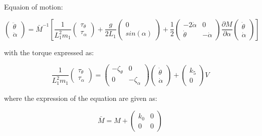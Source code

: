 
Equaion of motion:

\begin{equation}
\left( \begin{matrix}
        \ddot \theta \\
        \ddot \alpha
    \end{matrix} \right) = \bar M^{-1} \left[
\frac{1}{ L_1^2 m_1}
    \left( \begin{matrix}
        \tau_{\theta} \\
        \tau_{\alpha}
    \end{matrix} \right)
    +\frac{g}{2L_1}
    \left( \begin{matrix}
        0 \\
        sin( \alpha)
    \end{matrix} \right)
     + \frac{1}{2} \left( \begin{matrix}
    - 2 \dot \alpha & 0\\
        \dot \theta & -\dot \alpha
    \end{matrix} \right)
    \frac{\partial M}{\partial \alpha}
     \left( \begin{matrix}
        \dot \theta \\
        \dot \alpha
    \end{matrix} \right) \right]
\end{equation}

with the torque expressed as:

\begin{equation}
\frac{1}{ L_1^2 m_1}
    \left( \begin{matrix}
        \tau_{\theta} \\
        \tau_{\alpha}
    \end{matrix} \right)
    = \left( \begin{matrix}
        -\zeta_\theta & 0 \\ 0 & -\zeta_\alpha
    \end{matrix}\right)
    \left( \begin{matrix}
        \dot \theta \\ \dot \alpha
    \end{matrix}\right)
    +
    \left( \begin{matrix}
    k_5 \\ 0    
    \end{matrix}\right)
    V
\end{equation}

where the expression of the equation are given as:

\begin{equation}
    \bar M = M + 
    \left( \begin{matrix}
       k_0 & 0 \\ 0 & 0
    \end{matrix} \right)
\end{equation}

